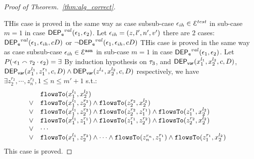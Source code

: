 \begin{proof}[Proof of Theorem.~\ref{thm:alg_correct}]
\begin{enumerate}
\end{enumerate}
%
THis case is proved in the same way as case subsub-case $\mathtt{\epsilon}_{ih} \in \mathcal{E}^{test}$ in sub-case $m = 1$ in case $\mathsf{DEP_{\mathtt{e}}}^{val}(\mathtt{\epsilon}_1, \mathtt{\epsilon}_2)$.
%
Let $\mathtt{\epsilon}_{ih} = (z, l', n', v')$  there are 2 cases:
$\mathsf{DEP_{\mathtt{e}}}^{val}(\mathtt{\epsilon}_1, \mathtt{\epsilon}_{ih}, c D)$ or $\neg \mathsf{DEP_{\mathtt{e}}}^{val}(\mathtt{\epsilon}_1, \mathtt{\epsilon}_{ih}, c D)$
%
%
THis case is proved in the same way as case subsub-case $\mathtt{\epsilon}_{ih} \in \mathcal{E}^{\mathtt{{asn}}}$ in sub-case $m = 1$ in case $\mathsf{DEP_{\mathtt{e}}}^{val}(\mathtt{\epsilon}_1, \mathtt{\epsilon}_2)$.
%
Let $P(\cdot \mathtt{\epsilon}_1 \smallfrown \mathtt{\tau}_2 \cdot \mathtt{\epsilon}_2) = \exists$
By induction hypothesis on $\mathtt{\tau}_3$,
 and $\mathsf{DEP_{var}}(x_1^{l_1}, x_2^{l_2}, c, D)$, 
$\mathsf{DEP_{var}}(x_1^{l_1}, z_1^{r_1}, c, D) \land \mathsf{DEP_{var}}(z^{l_z}, x_2^{l_2}, c, D)$ respectively, 
we have $\exists z_2^{r_2}, \cdots, z_n^{r_2}, 1 \leq n \leq m'+1$ s.t.:
\[
\begin{array}{ll}
      & \mathtt{flowsTo}(x_1^{l_1}, x_2^{l_2}) \\
  \lor  & \mathtt{flowsTo}(x_1^{l_1}, z_2^{r_2}) \land \mathtt{flowsTo}(z_2^{r_2}, x_2^{l_2})\\
  \lor  & \mathtt{flowsTo}(x_1^{l_1}, z_2^{r_2}) \land \mathtt{flowsTo}(z_2^{r_2}, z_1^{r_1}) \land \mathtt{flowsTo}(z_1^{r_1}, x_2^{l_2}) \\
  \lor  & \mathtt{flowsTo}(x_1^{l_1}, z_1^{r_1}) \land \mathtt{flowsTo}(z_1^{r_1}, z_2^{r_2}) \land \mathtt{flowsTo}(z_2^{r_2}, x_2^{l_2}) \\
  \lor  & \cdots \\
  \lor  & \mathtt{flowsTo}(x_1^{l_1}, z_2^{r_2}) \land \cdots \land \mathtt{flowsTo}(z_n^{r_n}, z_1^{r_1}) \land \mathtt{flowsTo}(z_1^{r_1}, x_2^{l_2}) \\
\end{array}
\]This case is proved.
\end{proof}